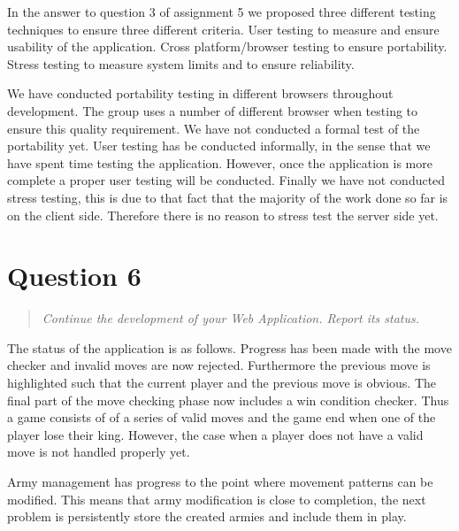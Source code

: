 \documentclass[10pt,a4paper]{report}
\begin{document}
In the answer to question 3 of assignment 5 we proposed three different testing techniques to ensure three different criteria. User testing to measure and ensure usability of the application. Cross platform/browser testing to ensure portability. Stress testing to measure system limits and to ensure reliability.

We have conducted portability testing in different browsers throughout development. The group uses a number of different browser when testing to ensure this quality requirement. We have not conducted a formal test of the portability yet. User testing has be conducted informally, in the sense that we have spent time testing the application. However, once the application is more complete a proper user testing will be conducted. Finally we have not conducted stress testing, this is due to that fact that the majority of the work done so far is on the client side. Therefore there is no reason to stress test the server side yet.

\section{Question 6}
\begin{quote}
\textit{Continue the development of your Web Application. Report its status.}
\end{quote}

The status of the application is as follows. Progress has been made with the move checker and invalid moves are now rejected. Furthermore the previous move is highlighted such that the current player and the previous move is obvious. The final part of the move checking phase now includes a win condition checker. Thus a game consists of of a series of valid moves and the game end when one of the player lose their king. However, the case when a player does not have a valid move is not handled properly yet.

Army management has progress to the point where movement patterns can be modified. This means that army modification is close to completion, the next problem is persistently store the created armies and include them in play.
\end{document}
